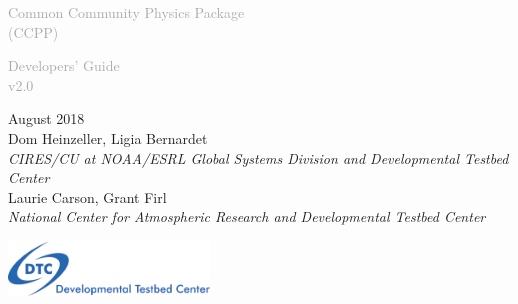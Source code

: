\begin{titlepage}
\renewcommand{\thefootnote}{\fnsymbol{footnote}}

\vspace*{1em}
\noindent

\begin{center}
\textcolor{darkgray}{\bigsf Common Community Physics Package\\[0.5ex] (CCPP)}
\vspace*{1em}

\textcolor{darkgray}{\bigst Developers' Guide\\[0.5ex] v2.0}
\vspace*{1em}

\large{August 2018}\\[4em]

Dom Heinzeller, Ligia Bernardet\\
\textit{\small{CIRES/CU at NOAA/ESRL Global Systems Division and Developmental Testbed Center}}\\[4em]

Laurie Carson, Grant Firl\\
\textit{\small{National Center for Atmospheric Research and Developmental Testbed Center}}\\[4em]

\vspace{4em}

\includegraphics[width=0.4\textwidth]{images/dtc_logo.png}\\[2em]

\end{center}
\end{titlepage}
\pagebreak{}
